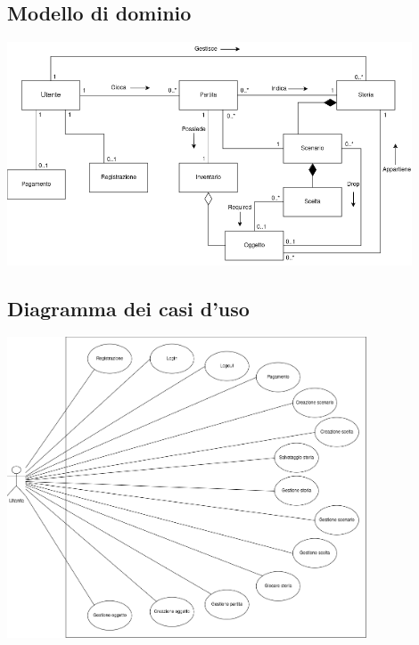 \documentclass{article}
\begin{document}
\subsection{Modello di dominio} 
\begin{center}
    \includegraphics[width=0.9\textwidth]{foto1.png}
\end{center}

\subsection{Diagramma dei casi d'uso}
\begin{center}
    \includegraphics[width=0.8\textwidth]{foto2.png}
\end{center}
\end{document}
